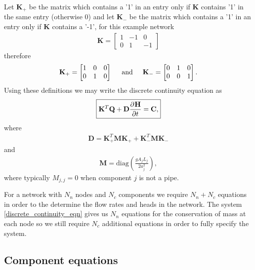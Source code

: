 Let $\mathbf{K}_+$ be the matrix which contains a '1' in an entry only if $\mathbf{K}$ contains '1' in the same entry (otherwise 0) and let $\mathbf{K}_-$ be the matrix which contains a '1' in an entry only if $\mathbf{K}$ contains a '-1', for this example network 
\begin{align*}
\mathbf{K} = \begin{bmatrix}
1 & -1 & 0 \\
0 & 1 & -1
\end{bmatrix}
\end{align*}
therefore
\begin{align*}
\mathbf{K}_+ = \begin{bmatrix}
1 & 0 & 0 \\
0 & 1 & 0
\end{bmatrix}
\hspace{0.5cm} \text{and} \hspace{0.5cm} \mathbf{K}_- = \begin{bmatrix}
0 & 1 & 0 \\
0 & 0 & 1
\end{bmatrix}.
\end{align*}
Using these definitions we may write the discrete continuity equation as 
\begin{align}\label{discrete_continuity_eqn}
\boxed{\mathbf{K}^T \mathbf{Q} + \mathbf{D} \frac{\partial^{} \mathbf{H}}{\partial t^{}} = \mathbf{C},}
\end{align}
where 
\begin{align*}
\mathbf{D} = \mathbf{K}_+^T \mathbf{M} \mathbf{K}_+ + \mathbf{K}_-^T \mathbf{M} \mathbf{K}_-
\end{align*}
and
\begin{align*}
\mathbf{M} = \text{diag}\left( \frac{gA_j L_j}{2 a_j^2}\right),
\end{align*}
where typically $M_{j,j} = 0$ when component $j$ is not a pipe.

For a network with $N_n$ nodes and $N_c$ components we require $N_n + N_c$ equations in order to the determine the flow rates and heads in the network. The system \eqref{discrete_continuity_eqn} gives us $N_n$ equations for the conservation of mass at each node so we still require $N_c$ additional equations in order to fully specify the system. 

\subsection{Component equations}

